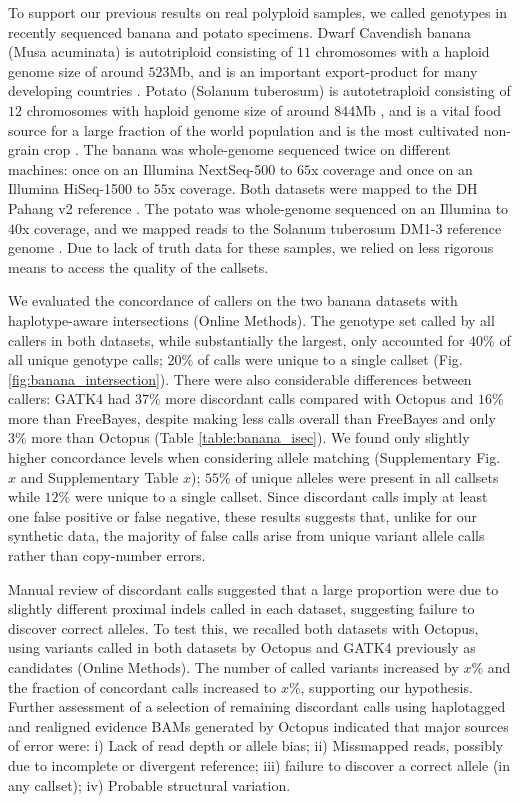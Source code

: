 \documentclass[notitlepage, twocolumn, 10pt]{article}
\begin{document}
To support our previous results on real polyploid samples, we called genotypes in recently sequenced banana \cite{RN670} and potato \cite{RN673} specimens. Dwarf Cavendish banana (Musa acuminata) is autotriploid consisting of $11$ chromosomes with a haploid genome size of around $523$Mb, and is an important export-product for many developing countries \cite{RN671}. Potato (Solanum tuberosum) is autotetraploid consisting of $12$ chromosomes with haploid genome size of around $844$Mb \cite{RN668}, and is a vital food source for a large fraction of the world population and is the most cultivated non-grain crop \cite{RN668}. The banana was whole-genome sequenced twice on different machines: once on an Illumina NextSeq-500 to $65$x coverage and once on an Illumina HiSeq-1500 to $55$x coverage. Both datasets were mapped to the DH Pahang v2 reference \cite{RN670}. The potato was whole-genome sequenced on an Illumina to $40$x coverage, and we mapped reads to the Solanum tuberosum DM1-3 reference genome \cite{RN672}. Due to lack of truth data for these samples, we relied on less rigorous means to access the quality of the callsets.

We evaluated the concordance of callers on the two banana datasets with haplotype-aware intersections (Online Methods). The genotype set called by all callers in both datasets, while substantially the largest, only accounted for $40\%$ of all unique genotype calls; $20\%$ of calls were unique to a single callset (Fig. \ref{fig:banana_intersection}). There were also considerable differences between callers: GATK4 had $37\%$ more discordant calls compared with Octopus and $16\%$ more than FreeBayes, despite making less calls overall than FreeBayes and only $3\%$ more than Octopus (Table \ref{table:banana_isec}). We found only slightly higher concordance levels when considering allele matching (Supplementary Fig. $x$ and Supplementary Table $x$); $55\%$ of unique alleles were present in all callsets while $12\%$ were unique to a single callset. Since discordant calls imply at least one false positive or false negative, these results suggests that, unlike for our synthetic data, the majority of false calls arise from unique variant allele calls rather than copy-number errors.

Manual review of discordant calls suggested that a large proportion were due to slightly different proximal indels called in each dataset, suggesting failure to discover correct alleles. To test this, we recalled both datasets with Octopus, using variants called in both datasets by Octopus and GATK4 previously as candidates (Online Methods). The number of called variants increased by $x\%$ and the fraction of concordant calls increased to $x\%$, supporting our hypothesis. Further assessment of a selection of remaining discordant calls using haplotagged and realigned evidence BAMs generated by Octopus indicated that major sources of error were: i) Lack of read depth or allele bias; ii) Missmapped reads, possibly due to incomplete or divergent reference; iii) failure to discover a correct allele (in any callset); iv) Probable structural variation. 
\end{document}
